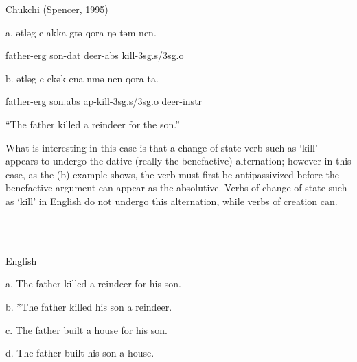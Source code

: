\documentclass[output=paper,modfonts,nonflat]{langsci/langscibook}
\begin{document}
          Chukchi (Spencer, 1995)

a.  ǝtlǝg-e  akka-gtǝ  qora-ŋǝ  tǝm-nen.

  father{}-erg  son{}-dat  deer{}-abs  kill-3sg.s/3sg.o

b.    ǝtlǝg-e  ekǝk    ena-nmǝ-nen    qora-ta.  

  father-erg  son.abs  ap{}-kill-3sg.s/3sg.o  deer-instr

  “The father killed a reindeer for the son.”

What is interesting in this case is that a change of state verb such as ‘kill’ appears to undergo the dative (really the benefactive) alternation; however in this case, as the (b) example shows, the verb must first be antipassivized before the benefactive argument can appear as the absolutive.   Verbs of change of state such as ‘kill’ in English do not undergo this alternation, while verbs of creation can.

\ea%
    \label{ex:key:14}
    \gll\\
        \\
    \glt
    \z

          English

a.  The father killed a reindeer for his son.

b.    *The father killed his son a reindeer.

c.  The father built a house for his son.

d.   The father built his son a house.
\end{document}
